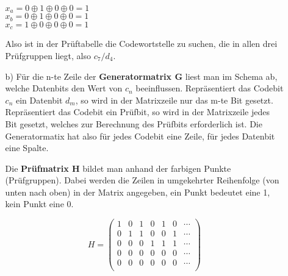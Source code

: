 \documentclass[a4paper,10pt]{scrartcl}
\begin{document}
\begin{enumerate}
\begin{enumerate}
            $x_a = 0 \oplus 1 \oplus 0 \oplus 0 = 1$\\
            $x_b = 0 \oplus 1 \oplus 0 \oplus 0 = 1$\\
            $x_c = 1 \oplus 0 \oplus 0 \oplus 0 = 1$

            Also ist in der Prüftabelle die Codewortstelle zu suchen, die in allen drei Prüfgruppen liegt, also $c_7/d_4$.

        \item[b)]
            Für die n-te Zeile der \textbf{Generatormatrix G} liest man im Schema ab, welche Datenbits den Wert von
            $c_n$ beeinflussen. Repräsentiert das Codebit $c_n$ ein Datenbit $d_m$, so wird in der Matrixzeile nur das
            m-te Bit gesetzt. Repräsentiert das Codebit ein Prüfbit, so wird in der Matrixzeile jedes Bit gesetzt, welches
            zur Berechnung des Prüfbits erforderlich ist. Die Generatormatix hat also für jedes Codebit eine Zeile, für
            jedes Datenbit eine Spalte.

            Die \textbf{Prüfmatrix H} bildet man anhand der farbigen Punkte (Prüfgruppen). Dabei werden die Zeilen in
            umgekehrter Reihenfolge (von unten nach oben) in der Matrix angegeben, ein Punkt bedeutet eine 1,
            kein Punkt eine 0.

            $$H = \begin{pmatrix}
            1 & 0 & 1 & 0 & 1 & 0 & \cdots \\ %
            0 & 1 & 1 & 0 & 0 & 1 & \cdots \\ %
            0 & 0 & 0 & 1 & 1 & 1 & \cdots \\ %
            0 & 0 & 0 & 0 & 0 & 0 & \cdots \\ %
            0 & 0 & 0 & 0 & 0 & 0 & \cdots \\ %
            \end{pmatrix}$$
    \end{enumerate}
\end{enumerate}
\end{document}
